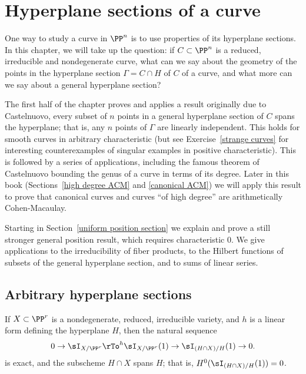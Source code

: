 



\chapter{Hyperplane sections of a curve}\label{uniform position}

One way to study a curve in $\PP^n$ is to use properties of its hyperplane sections. In this chapter, we will take up the question: if $C \subset \PP^n$ is a reduced, irreducible and nondegenerate curve, what can we say about the geometry of the points in the  hyperplane section $\Gamma = C \cap H$ of $C$ of a curve, and what more can we say about a general hyperplane section?


The first half of the chapter proves and applies a result originally due to Castelnuovo, every subset of $n$ points in a
general hyperplane section of $C$ spans the hyperplane; that is, any $n$ points of $\Gamma$ are linearly independent. This 
holds for smooth curves in arbitrary characteristic (but see Exercise~\ref{strange curves} for
interesting counterexamples of singular examples in positive characteristic). This is followed by a series of applications,
including the famous theorem of Castelnuovo bounding the genus of a curve in terms of its degree. Later in this
book (Sections~\ref{high degree ACM} and \ref{canonical ACM}) we will apply this result to prove that canonical curves and 
curves ``of high degree'' are arithmetically Cohen-Macaulay.

Starting in Section~\ref{uniform position section} we explain and prove a still stronger general position result, which requires characteristic 0. We give applications to the irreducibility of fiber products, to the Hilbert functions of subsets of the
general hyperplane section, and to sums of linear series.

\section{Arbitrary hyperplane sections}

\begin{proposition}\label{arbitrary hyperplane}
If $X\subset \PP^r$ is a nondegenerate, reduced, irreducible variety, and $h$ is a linear form defining
the hyperplane $H$, then the natural
sequence
$$
0\to \sI_{X/\PP^r} \rTo^h \sI_{X/\PP^r}(1)\to \sI_{(H\cap X)/H}(1)\to 0.
$$
is exact, and the subscheme
$H\cap X$ spans $H$; that is, $H^0(\sI_{(H\cap X)/H}(1)) = 0$.
\end{proposition}

